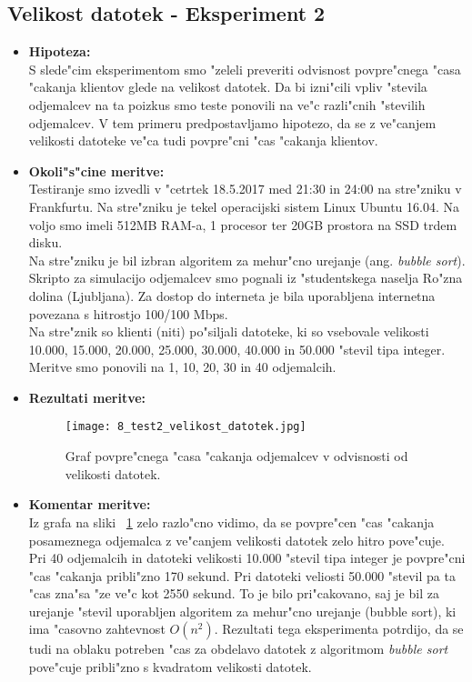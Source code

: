 \subsection{Velikost datotek - Eksperiment 2}
\label{8_subsec:eksperiment_2}
\begin{itemize}
	\item \textbf{Hipoteza: }  \\
		S slede"cim eksperimentom smo "zeleli preveriti odvisnost povpre"cnega "casa "cakanja klientov glede na velikost datotek. Da bi izni"cili vpliv "stevila odjemalcev na ta poizkus smo teste ponovili na ve"c razli"cnih "stevilih odjemalcev. V tem primeru predpostavljamo hipotezo, da se z ve"canjem velikosti datoteke ve"ca tudi povpre"cni "cas "cakanja klientov.

	\item \textbf{Okoli"s"cine meritve: } \\
		Testiranje smo izvedli v "cetrtek 18.5.2017 med 21:30 in 24:00 na stre"zniku v Frankfurtu. Na stre"zniku je tekel operacijski sistem Linux Ubuntu 16.04. Na voljo smo imeli 512MB RAM-a, 1 procesor ter 20GB prostora na SSD trdem disku.\\ Na stre"zniku je bil izbran algoritem za mehur"cno urejanje (ang. \textit{bubble sort}). Skripto za simulacijo odjemalcev smo pognali iz "studentskega naselja Ro"zna dolina (Ljubljana). Za dostop do interneta je bila uporabljena internetna povezana s hitrostjo 100/100 Mbps.\\ Na stre"znik so klienti (niti) po"siljali datoteke, ki so vsebovale velikosti 10.000, 15.000, 20.000, 25.000, 30.000, 40.000 in 50.000 "stevil tipa integer. Meritve smo ponovili na 1, 10, 20, 30 in 40 odjemalcih.

 	\item \textbf{Rezultati meritve: }  \\

    \begin{figure}[!h]
      \centering
        \texttt{[image: 8\_test2\_velikost\_datotek.jpg]}
      \caption{Graf povpre"cnega "casa "cakanja odjemalcev v odvisnosti od velikosti datotek.}
      \label{8_graf_2_rez}
    \end{figure}

    \pagebreak
	\item \textbf{Komentar meritve: } \\
		Iz grafa na sliki ~\ref{8_graf_2_rez} zelo razlo"cno vidimo, da se povpre"cen "cas "cakanja posameznega odjemalca z ve"canjem velikosti datotek zelo hitro pove"cuje. Pri 40 odjemalcih in datoteki velikosti 10.000 "stevil tipa integer je povpre"cni "cas "cakanja pribli"zno 170 sekund. Pri datoteki veliosti 50.000 "stevil pa ta "cas zna"sa "ze ve"c kot 2550 sekund. To je bilo pri"cakovano, saj je bil za urejanje "stevil uporabljen algoritem za mehur"cno urejanje (bubble sort), ki ima "casovno zahtevnost $O(n^2)$. Rezultati tega eksperimenta potrdijo, da se tudi na oblaku potreben "cas za obdelavo datotek z algoritmom \textit{bubble sort} pove"cuje pribli"zno s kvadratom velikosti datotek.
\end{itemize}

